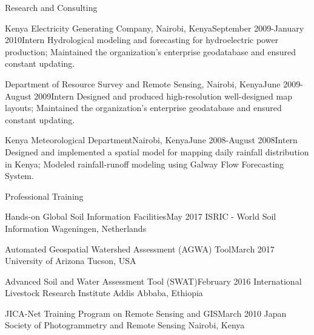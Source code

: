 \documentclass{resume} %
\begin{document}
\begin{rSection}{Research and Consulting}
\begin{pSubsection}{Kenya Electricity Generating Company, }{Nairobi, Kenya}{September 2009-January 2010}{Intern}
{Hydrological modeling and forecasting for hydroelectric power production; Maintained the organization's enterprise geodatabase and ensured constant updating.}
\end{pSubsection}

\begin{pSubsection}{Department of Resource Survey and Remote Sensing, }{Nairobi, Kenya}{June 2009-August 2009}{Intern}
{Designed and produced high-resolution well-designed map layouts; Maintained the organization's enterprise geodatabase and ensured constant updating.}
\end{pSubsection}

\begin{pSubsection}{Kenya Meteorological Department}{Nairobi, Kenya}{June 2008-August 2008}{Intern}
{Designed and implemented a spatial model for mapping daily rainfall distribution in Kenya; Modeled rainfall-runoff modeling using Galway Flow Forecasting System.}
\end{pSubsection}
\end{rSection}



\begin{rSection}{Professional Training}

\begin{sSubsection}{Hands-on Global Soil Information Facilities}{}{May 2017}{ ISRIC - World Soil Information }{Wageningen, Netherlands}
\end{sSubsection}

\begin{sSubsection}{Automated Geospatial Watershed Assessment (AGWA) Tool}{}{March 2017}{ University of Arizona }{Tucson, USA}
\end{sSubsection}

\begin{sSubsection}{Advanced Soil and Water Assessment Tool (SWAT)}{}{February 2016}{ International Livestock Research Institute }{Addis Abbaba, Ethiopia}
\end{sSubsection}

\begin{sSubsection}{JICA-Net Training Program on Remote Sensing and GIS}{}{March 2010}{ Japan Society of Photogrammetry and Remote Sensing }{Nairobi, Kenya}
\end{sSubsection}

\end{rSection}
\end{document}
